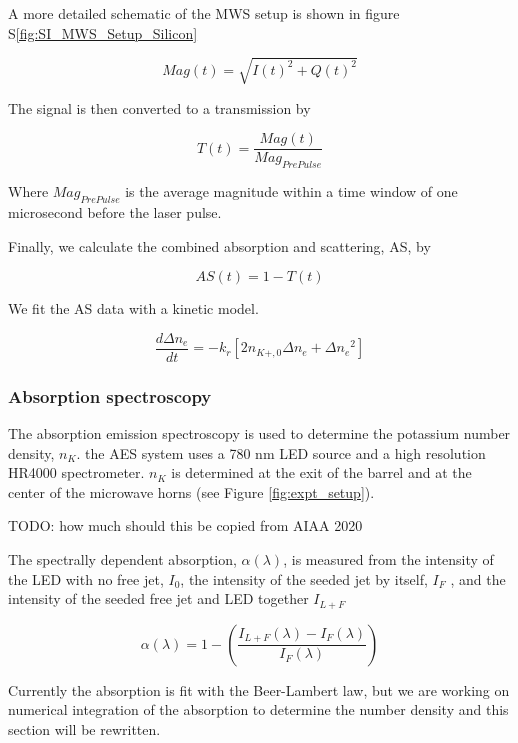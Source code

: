 A more detailed schematic of the MWS setup is shown in figure S\ref*{fig:SI_MWS_Setup_Silicon}

\begin{equation}
    Mag(t) = \sqrt{I(t)^2 + Q(t)^2}
\end{equation}

The signal is then converted to a transmission by 

\begin{equation}
    T(t) = \frac{Mag(t)}{Mag_{Pre Pulse}}
\end{equation}

Where $Mag_{Pre Pulse}$ is the average magnitude within a time window of one microsecond before the laser pulse. 

Finally, we calculate the combined absorption and scattering, AS, by

\begin{equation}
    AS(t) = 1 - T(t)
\end{equation}

We fit the AS data with a kinetic model. 

\begin{equation}
    \frac{d\Delta n_e}{dt} = - k_r [2 n_{K+,0}\Delta n_e + \Delta{n_e}^2]
\end{equation}

\subsubsection{Absorption spectroscopy}

The absorption emission spectroscopy is used to determine the potassium number density, $n_K$. the AES system uses a 780 nm LED source and a high resolution HR4000 spectrometer. $n_K$ is determined at the exit of the barrel and at the center of the microwave horns (see Figure \ref{fig:expt_setup}).

TODO: how much should this be copied from AIAA 2020

The spectrally dependent absorption, $\alpha(\lambda)$, is measured from the intensity of the LED with no free jet, $I_0$, the intensity
of the seeded jet by itself, $I_F$ , and the intensity of the seeded free jet and LED together $I_{L+F}$


\begin{equation}
    \alpha(\lambda) = 1 - \left(\frac{I_{L+F}(\lambda) - I_{F}(\lambda)}{I_F(\lambda)}\right)
\end{equation}

Currently the absorption is fit with the Beer-Lambert law, but we are working on numerical integration of the absorption to determine the number density and this section will be rewritten. 

